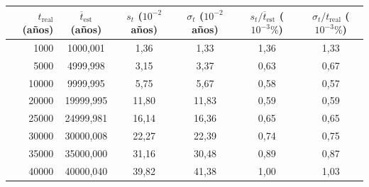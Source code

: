 \begin{tabular}{rccccc}
\toprule
$t_{\mathrm{real}}$ (años) & $\overline{t}_{\mathrm{est}}$ (años) & $s_t$ ($10^{-2}$ años) & $\sigma_t$ ($10^{-2}$ años) & $s_t/\overline{t}_{\mathrm{est}}$ ($10^{-3}\%$) & $\sigma_t/t_{\mathrm{real}}$ ($10^{-3}\%$) \\
\midrule
1000 & 1000,001 & 1,36 & 1,33 & 1,36 & 1,33 \\
5000 & 4999,998 & 3,15 & 3,37 & 0,63 & 0,67 \\
10000 & 9999,995 & 5,75 & 5,67 & 0,58 & 0,57 \\
20000 & 19999,995 & 11,80 & 11,83 & 0,59 & 0,59 \\
25000 & 24999,981 & 16,14 & 16,36 & 0,65 & 0,65 \\
30000 & 30000,008 & 22,27 & 22,39 & 0,74 & 0,75 \\
35000 & 35000,000 & 31,16 & 30,48 & 0,89 & 0,87 \\
40000 & 40000,040 & 39,82 & 41,38 & 1,00 & 1,03 \\
\bottomrule
\end{tabular}
